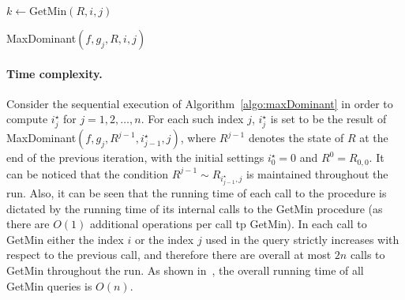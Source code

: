 
\begin{algorithm}
	$k \gets \text{GetMin}(R, i, j)$\;
	\;
	\caption{MaxDominant$(f, g_j, R, i, j)$}
	\label{algo:maxDominant}
\end{algorithm}


\paragraph{Time complexity.}
Consider the sequential execution of Algorithm~\ref{algo:maxDominant} in order to compute $i^\star_j$ for $j = 1, 2, \ldots, n$. For each such index $j$, $i^\star_j$ is set to be the result of MaxDominant$(f, g_j, R^{j-1}, i^\star_{j-1}, j)$, where $R^{j-1}$ denotes the state of $R$ at the end of the previous iteration, with the initial settings $i^\star_0 = 0$ and $R^0 = R_{0, 0}$. It can be noticed that the condition $R^{j-1} \sim R_{i^\star_{j-1}, j}$ is maintained throughout the run. Also, it can be seen that the running time of each call to the procedure is dictated by the running time of its internal calls to the GetMin procedure (as there are $O(1)$ additional operations per call tp GetMin). In each call to GetMin either the index $i$ or the index $j$ used in the query strictly increases with respect to the previous call, and therefore there are overall at most $2n$ calls to GetMin throughout the run. As shown in~\cite{lee2007simple}, the overall running time of all GetMin queries is $O(n)$.


